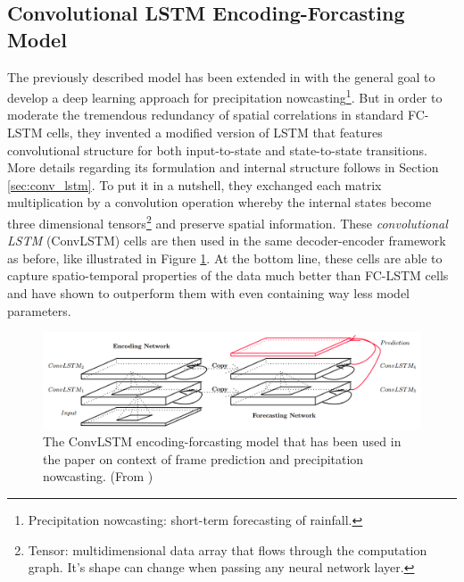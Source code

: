 \subsection{Convolutional LSTM Encoding-Forcasting Model}

The previously described model has been extended in \parencite{conv_lstm_nowcasting} with the general goal to develop a deep learning approach for precipitation nowcasting\footnote{Precipitation nowcasting: short-term forecasting of rainfall.}. But in order to moderate the tremendous redundancy of spatial correlations in standard FC-LSTM cells, they invented a modified version of LSTM that features convolutional structure for both input-to-state and state-to-state transitions. More details regarding its formulation and internal structure follows in Section \ref{sec:conv_lstm}. To put it in a nutshell, they exchanged each matrix multiplication by a convolution operation whereby the internal states become three dimensional tensors\footnote{Tensor: multidimensional data array that flows through the computation graph. It's shape can change when passing any neural network layer.} and preserve spatial information. These \textit{convolutional LSTM} (ConvLSTM) cells are then used in the same decoder-encoder framework as before, like illustrated in Figure \ref{fig:convlstm_model}. At the bottom line, these cells are able to capture spatio-temporal properties of the data much better than FC-LSTM cells and have shown to outperform them with even containing way less model parameters.

\begin{figure}[htb]
	\centering
	\includegraphics[width=0.8\linewidth]{figures/related/nowcasting_model.png} 
	\caption[ConvLSTM Encoding-Forecasting Model]{The ConvLSTM encoding-forcasting model that has been used in the paper on context of frame prediction and precipitation nowcasting. (From \parencite{conv_lstm_nowcasting})} \label{fig:convlstm_model}
\end{figure}

